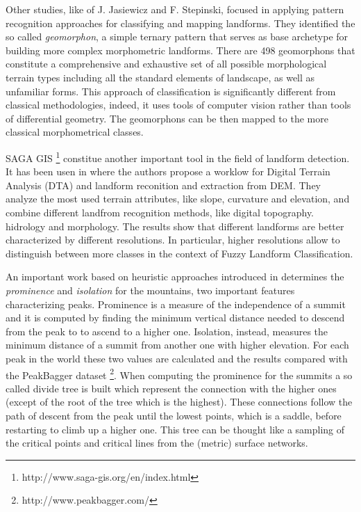 Other studies, like \cite{JASIEWICZ2013147} of J. Jasiewicz and F. Stepinski, focused in applying pattern recognition approaches for classifying and mapping landforms. They identified the so called \textit{geomorphon}, a simple ternary pattern that serves as base archetype for building more complex morphometric landforms. There are 498 geomorphons that constitute a comprehensive and exhaustive set of all possible morphological terrain types including all the standard elements of landscape, as well as unfamiliar forms. This approach of classification is significantly different from classical methodologies, indeed, it uses tools of computer vision rather than tools of differential geometry. The geomorphons can be then mapped to the more classical morphometrical classes. 

SAGA GIS \footnote{http://www.saga-gis.org/en/index.html} constitue another important tool in the field of landform detection. It has been usen in \cite{schillaci2} where the authors propose a worklow for Digital Terrain Analysis (DTA) and landform reconition and extraction from DEM. They analyze the most used terrain attributes, like slope, curvature and elevation, and combine different landfrom recognition methods, like digital topography. hidrology and morphology. The results show that different landforms are better characterized by different resolutions. In particular, higher resolutions allow to distinguish between more classes in the context of Fuzzy Landform Classification.

An important work based on heuristic approaches introduced in \cite{kirmse2017calculating} determines the \textit{prominence} and \textit{isolation} for the mountains, two important features characterizing peaks. Prominence is a measure of the independence of a summit and it is computed by finding the minimum vertical distance needed to descend from the peak to  to ascend to a higher one. Isolation, instead, measures the minimum distance of a summit from another one with higher elevation. For each peak in the world these two values are calculated and the results compared with the PeakBagger dataset \footnote{http://www.peakbagger.com/}. When computing the prominence for the summits a so called divide tree is built which represent the connection with the higher ones (except of the root of the tree which is the highest). These connections follow the path of descent from the peak until the lowest points, which is a saddle, before restarting to climb up a higher one. This tree can be thought like a sampling of the critical points and critical lines from the (metric) surface networks.


